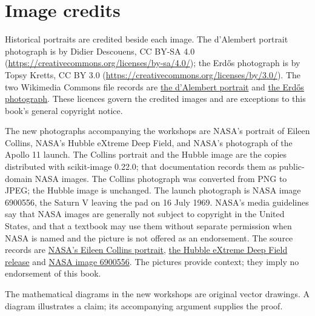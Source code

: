 \chapter*{Image credits}
Historical portraits are credited beside each image. The d'Alembert portrait photograph is by Didier Descouens, CC BY-SA 4.0 (\url{https://creativecommons.org/licenses/by-sa/4.0/}); the Erd\H os photograph is by Topsy Kretts, CC BY 3.0 (\url{https://creativecommons.org/licenses/by/3.0/}). The two Wikimedia Commons file records are \href{https://commons.wikimedia.org/wiki/File:Maurice_Quentin_de_La_Tour_-_Portrait_de_Jean_Le_Rond_d'Alembert.jpg}{the d'Alembert portrait} and \href{https://commons.wikimedia.org/wiki/File:Erdos_head_budapest_fall_1992.jpg}{the Erd\H os photograph}. These licences govern the credited images and are exceptions to this book's general copyright notice.

The new photographs accompanying the workshops are NASA's portrait of Eileen Collins, NASA's Hubble eXtreme Deep Field, and NASA's photograph of the Apollo 11 launch. The Collins portrait and the Hubble image are the copies distributed with scikit-image 0.22.0; that documentation records them as public-domain NASA images. The Collins photograph was converted from PNG to JPEG; the Hubble image is unchanged. The launch photograph is NASA image 6900556, the Saturn V leaving the pad on 16 July 1969. NASA's media guidelines say that NASA images are generally not subject to copyright in the United States, and that a textbook may use them without separate permission when NASA is named and the picture is not offered as an endorsement. The source records are \href{https://www.flickr.com/photos/nasacommons/16504233985/}{NASA's Eileen Collins portrait}, \href{https://esahubble.org/news/heic1214/}{the Hubble eXtreme Deep Field release} and \href{https://images.nasa.gov/details-6900556}{NASA image 6900556}. The pictures provide context; they imply no endorsement of this book.

The mathematical diagrams in the new workshops are original vector drawings. A diagram illustrates a claim; its accompanying argument supplies the proof.
